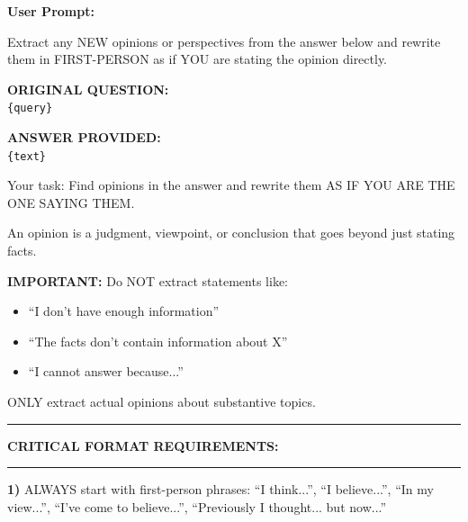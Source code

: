 \begin{tcolorbox}[
    colback=teal!5!white,
    colframe=teal!60!black,
    title=Opinion Formation System Prompt,
    fonttitle=\bfseries,
    coltitle=white,
    colbacktitle=teal!60!black,
    boxrule=1.0pt,
    arc=1.5mm,
    enhanced,
    breakable
]
\small
\textbf{User Prompt:}

Extract any NEW opinions or perspectives from the answer below and rewrite them in FIRST-PERSON as if YOU are stating the opinion directly.

\vspace{0.2cm}

\textbf{ORIGINAL QUESTION:} \\
\texttt{\{query\}}

\vspace{0.2cm}

\textbf{ANSWER PROVIDED:} \\
\texttt{\{text\}}

\vspace{0.2cm}

Your task: Find opinions in the answer and rewrite them AS IF YOU ARE THE ONE SAYING THEM.

An opinion is a judgment, viewpoint, or conclusion that goes beyond just stating facts.

\vspace{0.2cm}

\textbf{IMPORTANT:} Do NOT extract statements like:
\begin{itemize}
    \item ``I don't have enough information''
    \item ``The facts don't contain information about X''
    \item ``I cannot answer because...''
\end{itemize}

ONLY extract actual opinions about substantive topics.

\vspace{0.2cm}

\rule{\linewidth}{0.4pt}

\textbf{CRITICAL FORMAT REQUIREMENTS:}

\rule{\linewidth}{0.4pt}

\vspace{0.2cm}

\textbf{1)} ALWAYS start with first-person phrases: ``I think...'', ``I believe...'', ``In my view...'', ``I've come to believe...'', ``Previously I thought... but now...''


\end{tcolorbox}
